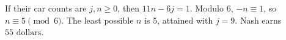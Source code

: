 If their car counts are $j,n\ge0$, then $11n-6j=1$. Modulo 6, $-n\equiv1$, so $n\equiv5\pmod6$. The least possible $n$ is 5, attained with $j=9$. Nash earns $\boxed{55\text{ dollars}}$.
